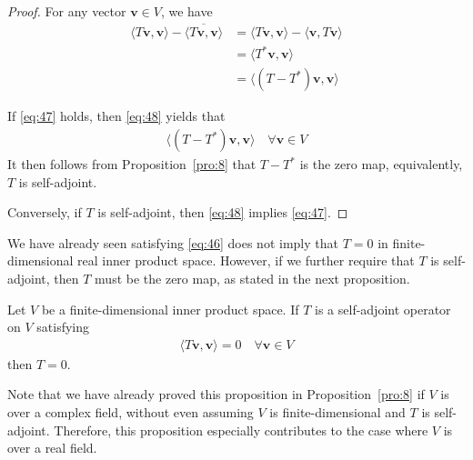 \documentclass[thmcnt=section, color=blue, 12pt]{my-elegantbook}
\begin{document}
\begin{proof}
	For any vector $\mathbf{v} \in V$, we have 
	\begin{align}
		\langle T \mathbf{v}, \mathbf{v} \rangle
		- \overline{\langle T \mathbf{v}, \mathbf{v} \rangle}
		&= \langle T \mathbf{v}, \mathbf{v} \rangle
		- \langle \mathbf{v}, T \mathbf{v} \rangle \nonumber \\ 
		&= \langle T^\ast \mathbf{v}, \mathbf{v} \rangle \nonumber \\
		&= \langle (T - T^\ast) \mathbf{v}, \mathbf{v} \rangle
		\label{eq:48}
	\end{align}

	If \eqref{eq:47} holds, then \eqref{eq:48} yields that 
	\begin{align*}
		\langle (T - T^\ast) \mathbf{v}, \mathbf{v} \rangle
		\quad \forall \mathbf{v} \in V
	\end{align*}
	It then follows from Proposition~\ref{pro:8} 
	that $T - T^\ast$ is the zero map, 
	equivalently, $T$ is self-adjoint.

	Conversely, if $T$ is self-adjoint, then \eqref{eq:48} 
	implies \eqref{eq:47}.
\end{proof}


We have already seen satisfying \eqref{eq:46} does not imply
that $T = 0$ in finite-dimensional real inner product space.
However, if we further require that $T$ is self-adjoint, 
then $T$ must be the zero map, as stated in the next proposition.

\begin{proposition} \label{pro:9}
	Let $V$ be a finite-dimensional inner product space.
	If $T$ is a self-adjoint operator on $V$ satisfying 
	\begin{align*}
		\langle T \mathbf{v}, \mathbf{v} \rangle = 0
		\quad \forall \mathbf{v} \in V
	\end{align*}
	then $T = 0$.
\end{proposition}

\begin{note}
	Note that we have already proved this proposition 
	in Proposition~\ref{pro:8}
	if $V$ is over a complex field,
	without even assuming $V$ is finite-dimensional 
	and $T$ is self-adjoint.
	Therefore, this proposition especially contributes to 
	the case where $V$ is over a real field.
\end{note}
\end{document}
